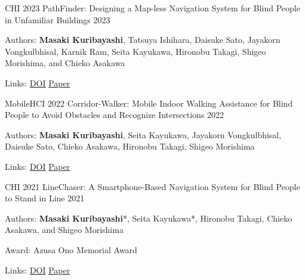\begin{cventries}
  \cventry
    {CHI 2023}
    {PathFinder: Designing a Map-less Navigation System for Blind People in Unfamiliar Buildings}
    {}
    {2023}
    {
      \begin{cvitems}
        \item {Authors: \textbf{Masaki Kuribayashi}, Tatsuya Ishihara, Daisuke Sato, Jayakorn Vongkulbhisal, Karnik Ram, Seita Kayukawa, Hironobu Takagi, Shigeo Morishima, and Chieko Asakawa}
        \item {Links: \href{https://doi.org/10.1145/3544548.3580687}{DOI} \enskip\textbar\enskip \href{https://www.masakikuribayashi.com/data/project/masaki_kuribayashi_chi_2023/paper.pdf}{Paper}}
      \end{cvitems}
    }

  \cventry
    {MobileHCI 2022}
    {Corridor-Walker: Mobile Indoor Walking Assistance for Blind People to Avoid Obstacles and Recognize Intersections}
    {}
    {2022}
    {
      \begin{cvitems}
        \item {Authors: \textbf{Masaki Kuribayashi}, Seita Kayukawa, Jayakorn Vongkulbhisal, Daisuke Sato, Chieko Asakawa, Hironobu Takagi, Shigeo Morishima}
        \item {Links: \href{https://doi.org/10.1145/3546714}{DOI} \enskip\textbar\enskip \href{https://www.masakikuribayashi.com/data/project/masaki_kuribayashi_mobilehci_2022/paper.pdf}{Paper}}
      \end{cvitems}
    }

  \cventry
    {CHI 2021}
    {LineChaser: A Smartphone-Based Navigation System for Blind People to Stand in Line}
    {}
    {2021}
    {
      \begin{cvitems}
        \item {Authors: \textbf{Masaki Kuribayashi}*, Seita Kayukawa*, Hironobu Takagi, Chieko Asakawa, and Shigeo Morishima}
        \item {Award: Azusa Ono Memorial Award}
        \item {Links: \href{https://dl.acm.org/doi/10.1145/3411764.3445451}{DOI} \enskip\textbar\enskip \href{https://www.masakikuribayashi.com/data/project/masaki_kuribayashi_chi_2021/paper.pdf}{Paper}}
      \end{cvitems}
    }

\end{cventries}

